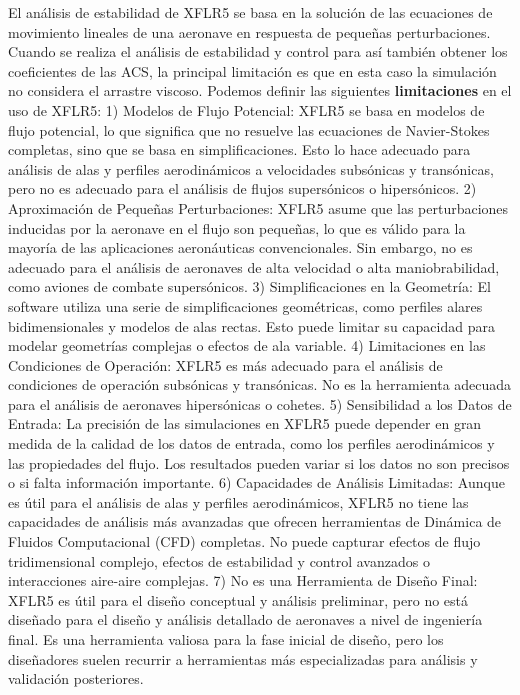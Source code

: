 El análisis de estabilidad de XFLR5 se basa en la solución de las ecuaciones de movimiento lineales de una aeronave en respuesta de pequeñas perturbaciones. Cuando se realiza el análisis de estabilidad y control para así también obtener los coeficientes de las ACS, la principal limitación es que en esta caso la simulación no considera el arrastre viscoso. 
Podemos definir las siguientes \textbf{limitaciones} en el uso de XFLR5:
%
1)  Modelos de Flujo Potencial: XFLR5 se basa en modelos de flujo potencial, lo que significa que no resuelve las ecuaciones de Navier-Stokes completas, sino que se basa en simplificaciones. Esto lo hace adecuado para análisis de alas y perfiles aerodinámicos a velocidades subsónicas y transónicas, pero no es adecuado para el análisis de flujos supersónicos o hipersónicos.
%
2) Aproximación de Pequeñas Perturbaciones: XFLR5 asume que las perturbaciones inducidas por la aeronave en el flujo son pequeñas, lo que es válido para la mayoría de las aplicaciones aeronáuticas convencionales. Sin embargo, no es adecuado para el análisis de aeronaves de alta velocidad o alta maniobrabilidad, como aviones de combate supersónicos.
%
3) Simplificaciones en la Geometría: El software utiliza una serie de simplificaciones geométricas, como perfiles alares bidimensionales y modelos de alas rectas. Esto puede limitar su capacidad para modelar geometrías complejas o efectos de ala variable. 
%
4) Limitaciones en las Condiciones de Operación: XFLR5 es más adecuado para el análisis de condiciones de operación subsónicas y transónicas. No es la herramienta adecuada para el análisis de aeronaves hipersónicas o cohetes.
%
5) Sensibilidad a los Datos de Entrada: La precisión de las simulaciones en XFLR5 puede depender en gran medida de la calidad de los datos de entrada, como los perfiles aerodinámicos y las propiedades del flujo. Los resultados pueden variar si los datos no son precisos o si falta información importante.
%
6) Capacidades de Análisis Limitadas: Aunque es útil para el análisis de alas y perfiles aerodinámicos, XFLR5 no tiene las capacidades de análisis más avanzadas que ofrecen herramientas de Dinámica de Fluidos Computacional (CFD) completas. No puede capturar efectos de flujo tridimensional complejo, efectos de estabilidad y control avanzados o interacciones aire-aire complejas.
%
7) No es una Herramienta de Diseño Final: XFLR5 es útil para el diseño conceptual y análisis preliminar, pero no está diseñado para el diseño y análisis detallado de aeronaves a nivel de ingeniería final. Es una herramienta valiosa para la fase inicial de diseño, pero los diseñadores suelen recurrir a herramientas más especializadas para análisis y validación posteriores. 
